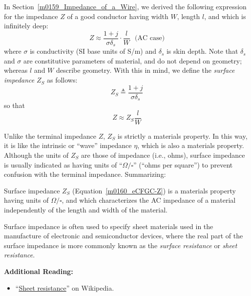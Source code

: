 

\label{m0160_Surface_Impedance} %

In Section~\ref{m0159_Impedance_of_a_Wire}, we derived the following expression for the impedance $Z$ of a good conductor having width $W$, length $l$, and which is infinitely deep:
%
\begin{equation}
Z \approx \frac{1+j}{\sigma\delta_s} \cdot \frac{l}{W} ~~~\mbox{(AC case)}
\label{m0160_eZ}
\end{equation}
%
where $\sigma$ is conductivity (SI base units of S/m) and $\delta_s$ is skin depth.
Note that $\delta_s$ and $\sigma$ are constitutive parameters of material, and do not depend on geometry; whereas $l$ and $W$ describe geometry.
With this in mind, we define the \emph{surface impedance} 
$Z_S$ as follows:
%
\begin{equation}
\boxed{
Z_S \triangleq \frac{1+j}{\sigma\delta_s}
\label{m0160_eCFGC-Z}
}
\end{equation}
%
so that
%
\begin{equation}
Z \approx Z_S \frac{l}{W}
\end{equation}
 
Unlike the terminal impedance $Z$, $Z_S$ is strictly a materials property.
In this way, it is like the intrinsic or ``wave'' impedance $\eta$, which is also a materials property.
Although the units of $Z_S$ are those of impedance (i.e., ohms), surface impedance is usually indicated as having units of ``$\Omega/\square$'' (``ohms per square'') to prevent confusion with the terminal impedance.
Summarizing:  
%
\begin{mdframed}[backgroundcolor=yellow!20,nobreak=true] 
Surface impedance $Z_S$ (Equation~\ref{m0160_eCFGC-Z}) is a materials property having units of $\Omega/\square$, and which characterizes the AC impedance of a material independently of the length and width of the material.
\end{mdframed}
%
Surface impedance is often used to specify sheet materials used in the manufacture of electronic and semiconductor devices, where the real part of the surface impedance is more commonly known as the \emph{surface resistance} or \emph{sheet resistance}.


{\bf Additional Reading:}
\begin{itemize}
\item ``\href{http://en.wikipedia.org/wiki/Sheet_resistance}{Sheet resistance}'' on Wikipedia.
\end{itemize}



